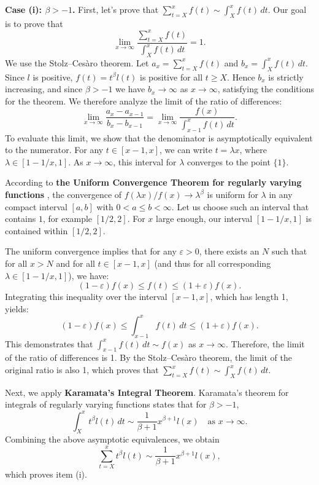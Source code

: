 \documentclass[letterpaper]{article}
\numberwithin{equation}{section}
\theoremstyle{definition}
\theoremstyle{remark}
\begin{document}
{\medskip\noindent\textbf{Case (i): $\beta>-1$.}}
First, let's prove that $\sum_{t=X}^x f(t) \sim \int_X^x f(t)\,dt$. Our goal is to prove that
\[
\lim_{x\to\infty} \frac{\sum_{t=X}^x f(t)}{\int_X^x f(t)\,dt} = 1.
\]
We use the Stolz--Ces\`aro theorem. Let $a_x = \sum_{t=X}^x f(t)$ and $b_x = \int_X^x f(t)\,dt$. {Since $l$ is positive, $f(t)=t^\beta l(t)$ is positive for all $t\ge X$.} Hence $b_x$ is strictly increasing, and {since $\beta>-1$ we have $b_x\to\infty$ as $x\to\infty$}, satisfying the conditions for the theorem. We therefore analyze the limit of the ratio of differences:
\begin{equation*}
\lim_{x \to \infty} \frac{a_x - a_{x-1}}{b_x - b_{x-1}}
= \lim_{x \to \infty} \frac{f(x)}{\int_{x-1}^x f(t)\,dt}.
\end{equation*}
To evaluate this limit, we show that the denominator is asymptotically equivalent to the numerator. For any $t \in [x-1, x]$, we can write $t = \lambda x$, where $\lambda \in [1 - 1/x, 1]$. As $x \to \infty$, this interval for $\lambda$ converges to the point $\{1\}$.

According to \textbf{the Uniform Convergence Theorem for regularly varying functions} \cite[Theorem 1.5.2]{bingham1989regular}, the convergence of $f(\lambda x)/f(x) \to \lambda^{\beta}$ is uniform for $\lambda$ in any compact interval $[a,b]$ with $0<a \le b < \infty$. Let us choose such an interval that contains $1$, for example $[1/2, 2]$. For $x$ large enough, our interval $[1-1/x, 1]$ is contained within $[1/2, 2]$.

The uniform convergence implies that for any $\varepsilon > 0$, there exists an $N$ such that for all $x > N$ and for all $t \in [x-1, x]$ (and thus for all corresponding $\lambda \in [1-1/x, 1]$), we have:
\begin{equation*}
(1-\varepsilon)f(x) \le f(t) \le (1+\varepsilon)f(x).
\end{equation*}
Integrating this inequality over the interval $[x-1, x]$, which has length 1, yields:
\begin{equation*}
(1-\varepsilon)f(x) \le \int_{x-1}^x f(t)\,dt \le (1+\varepsilon)f(x).
\end{equation*}
This demonstrates that $\int_{x-1}^x f(t)\,dt \sim f(x)$ as $x \to \infty$. Therefore, the limit of the ratio of differences is 1. By the Stolz--Ces\`aro theorem, the limit of the original ratio is also 1, which proves that $\sum_{t=X}^x f(t) \sim \int_X^x f(t)\,dt$.

Next, we apply \textbf{Karamata's Integral Theorem}. Karamata's theorem for integrals of regularly varying functions \cite[Proposition 1.5.8]{bingham1989regular} states that for ${\beta}>-1$,
\[
    \int_X^x t^{\beta} l(t)\,dt \sim \frac{1}{{\beta}+1} x^{{\beta}+1} l(x) \quad \text{as } x \to \infty.
\]
Combining the above asymptotic equivalences, we obtain
\[
    \sum_{t=X}^x t^{\beta} l(t) \sim \frac{1}{{\beta}+1}x^{{\beta}+1}l(x),
\]
which proves item (i).
\end{document}
